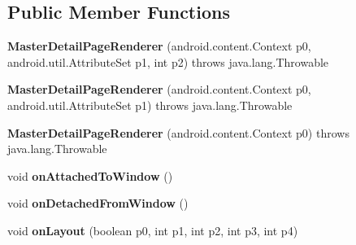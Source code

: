 \subsection*{Public Member Functions}
\begin{DoxyCompactItemize}
\item 
\mbox{\label{classmd5270abb39e60627f0f200893b490a1ade_1_1MasterDetailPageRenderer_acd2afc3edbdac35127b2980b773db408}} 
{\bfseries Master\+Detail\+Page\+Renderer} (android.\+content.\+Context p0, android.\+util.\+Attribute\+Set p1, int p2)  throws java.\+lang.\+Throwable 	
\item 
\mbox{\label{classmd5270abb39e60627f0f200893b490a1ade_1_1MasterDetailPageRenderer_ab7a70ecd01dd5f83f0df23ee11316a02}} 
{\bfseries Master\+Detail\+Page\+Renderer} (android.\+content.\+Context p0, android.\+util.\+Attribute\+Set p1)  throws java.\+lang.\+Throwable 	
\item 
\mbox{\label{classmd5270abb39e60627f0f200893b490a1ade_1_1MasterDetailPageRenderer_a2d9ba8d783e2532ed875ba9fcda99f6e}} 
{\bfseries Master\+Detail\+Page\+Renderer} (android.\+content.\+Context p0)  throws java.\+lang.\+Throwable 	
\item 
\mbox{\label{classmd5270abb39e60627f0f200893b490a1ade_1_1MasterDetailPageRenderer_a0e38081a0adcf6e0526920a845a89255}} 
void {\bfseries on\+Attached\+To\+Window} ()
\item 
\mbox{\label{classmd5270abb39e60627f0f200893b490a1ade_1_1MasterDetailPageRenderer_ac306b3abe0e030793a8b3770eb8cff33}} 
void {\bfseries on\+Detached\+From\+Window} ()
\item 
\mbox{\label{classmd5270abb39e60627f0f200893b490a1ade_1_1MasterDetailPageRenderer_aea5f0c192c83f2cfc6c7ede79f81495f}} 
void {\bfseries on\+Layout} (boolean p0, int p1, int p2, int p3, int p4)
\item 
\mbox{\label{classmd5270abb39e60627f0f200893b490a1ade_1_1MasterDetailPageRenderer_a3b3b26b7b29096785254d78ed482f84e}} 

\end{DoxyCompactItemize}
